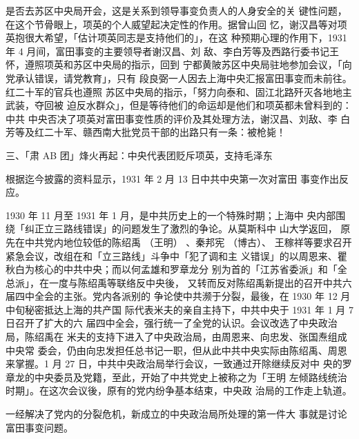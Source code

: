 是否去苏区中央局开会，这是关系到领导事变负责人的人身安全的关
键性问题，在这个节骨眼上，项英的个人威望起决定性的作用。据曾山回
忆，谢汉昌等对项英抱很大希望，「估计项英同志是支持他们的」，在这
种预期心理的作用下，1931 年 4 月间，富田事变的主要领导者谢汉昌、刘
敌、李白芳等及西路行委书记王怀，遵照项英和苏区中央局的指示，回到
宁都黄陂苏区中央局驻地参加会议，「向党承认错误，请党教育」，只有
段良弼一人因去上海中央汇报富田事变而未前往。红二十军的官兵也遵照
苏区中央局的指示，「努力向泰和、固江北路歼灭各地地主武装，夺回被
迫反水群众」，但是等待他们的命运却是他们和项英都未曾料到的：中共
中央否决了项英对富田事变性质的评价及其处理方法，谢汉昌、刘敌、李
白芳等及红二十军、赣西南大批党员干部的出路只有一条：被枪毙！

三、「肃 AB 团」烽火再起：中央代表团贬斥项英，支持毛泽东

根据迄今披露的资料显示，1931 年 2 月 13 日中共中央第一次对富田
事变作出反应。
 
1930 年 11 月至 1931 年 1 月，是中共历史上的一个特殊时期；上海中
央内部围绕「纠正立三路线错误」的问题发生了激烈的争论。从莫斯科中
山大学返回，
原先在中共党内地位较低的陈绍禹
（王明） 、秦邦宪
（博古）、
王稼祥等要求召开紧急会议，改组在和「立三路线」斗争中「犯了调和主
义错误」的以周恩来、瞿秋白为核心的中共中央；而以何孟雄和罗章龙分
别为首的「江苏省委派」和「全总派」，在一度与陈绍禹等联络反中央後，
又转而反对陈绍禹新提出的召开中共六届四中全会的主张。党内各派别的
争论使中共濒于分裂，最後，在 1930 年 12 月中旬秘密抵达上海的共产国
际代表米夫的亲自主持下，中共中央于 1931 年 1 月 7 日召开了扩大的六
届四中全会，强行统一了全党的认识。会议改选了中央政治局，陈绍禹在
米夫的支持下进入了中央政治局，由周恩来、向忠发、张国焘组成中央常
委会，仍由向忠发担任总书记一职，但从此中共中央实际由陈绍禹、周恩
来掌握。1 月 27 日，中共中央政治局举行会议，一致通过开除继续反对中
央的罗章龙的中央委员及党籍，至此，开始了中共党史上被称之为「王明
左倾路线统治时期」。在这次会议後，原有的党内纷争基本结束，中央政
治局的工作走上轨道。

一经解决了党内的分裂危机，新成立的中央政治局所处理的第一件大
事就是讨论富田事变问题。

